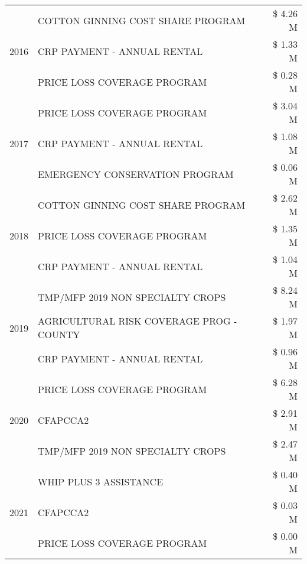 \begin{tabular}{llr}
\cline{1-3}
\multirow[t]{3}{*}{2016} & COTTON GINNING COST SHARE PROGRAM & \$ 4.26 M \\
 & CRP PAYMENT - ANNUAL RENTAL & \$ 1.33 M \\
 & PRICE LOSS COVERAGE PROGRAM & \$ 0.28 M \\
\cline{1-3}
\multirow[t]{3}{*}{2017} & PRICE LOSS COVERAGE PROGRAM & \$ 3.04 M \\
 & CRP PAYMENT - ANNUAL RENTAL & \$ 1.08 M \\
 & EMERGENCY CONSERVATION PROGRAM & \$ 0.06 M \\
\cline{1-3}
\multirow[t]{3}{*}{2018} & COTTON GINNING COST SHARE PROGRAM & \$ 2.62 M \\
 & PRICE LOSS COVERAGE PROGRAM & \$ 1.35 M \\
 & CRP PAYMENT - ANNUAL RENTAL & \$ 1.04 M \\
\cline{1-3}
\multirow[t]{3}{*}{2019} & TMP/MFP 2019 NON SPECIALTY CROPS & \$ 8.24 M \\
 & AGRICULTURAL RISK COVERAGE PROG - COUNTY & \$ 1.97 M \\
 & CRP PAYMENT - ANNUAL RENTAL & \$ 0.96 M \\
\cline{1-3}
\multirow[t]{3}{*}{2020} & PRICE LOSS COVERAGE PROGRAM & \$ 6.28 M \\
 & CFAPCCA2 & \$ 2.91 M \\
 & TMP/MFP 2019 NON SPECIALTY CROPS & \$ 2.47 M \\
\cline{1-3}
\multirow[t]{3}{*}{2021} & WHIP PLUS 3 ASSISTANCE & \$ 0.40 M \\
 & CFAPCCA2 & \$ 0.03 M \\
 & PRICE LOSS COVERAGE PROGRAM & \$ 0.00 M \\
\cline{1-3}
\bottomrule
\end{tabular}
